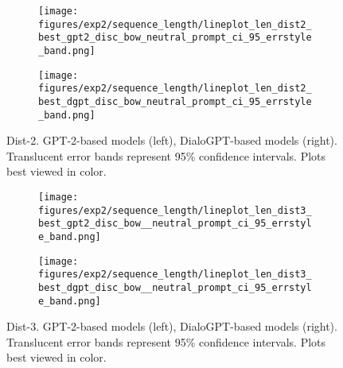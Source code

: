 \begin{figure}[H]
     \centering
     \begin{subfigure}[b]{0.49\textwidth}
        \centering
\texttt{[image: figures/exp2/sequence\_length/lineplot\_len\_dist2\_best\_gpt2\_disc\_bow\_neutral\_prompt\_ci\_95\_errstyle\_band.png]}
        \caption{}
        \label{subfig:lineplot_length_dist2_np_gpt2}
     \end{subfigure}
     \hfill
     \begin{subfigure}[b]{0.49\textwidth}
        \centering
        \texttt{[image: figures/exp2/sequence\_length/lineplot\_len\_dist2\_best\_dgpt\_disc\_bow\_neutral\_prompt\_ci\_95\_errstyle\_band.png]}
        \caption{}
        \label{subfig:lineplot_length_dist2_np_dgpt}
     \end{subfigure}
        \caption{Dist-2. GPT-2-based models (left), DialoGPT-based models (right). Translucent error bands represent 95\% confidence intervals. Plots best viewed in color.}
        \label{fig:lineplots_length_dist2_np_gpt2_dgpt}
\end{figure}

\begin{figure}[H]
     \centering
     \begin{subfigure}[b]{0.49\textwidth}
        \centering
\texttt{[image: figures/exp2/sequence\_length/lineplot\_len\_dist3\_best\_gpt2\_disc\_bow\_\_neutral\_prompt\_ci\_95\_errstyle\_band.png]}
        \caption{}
        \label{subfig:lineplot_length_dist3_np_gpt2}
     \end{subfigure}
     \hfill
     \begin{subfigure}[b]{0.49\textwidth}
        \centering
        \texttt{[image: figures/exp2/sequence\_length/lineplot\_len\_dist3\_best\_dgpt\_disc\_bow\_\_neutral\_prompt\_ci\_95\_errstyle\_band.png]}
        \caption{}
        \label{subfig:lineplot_length_dist3_np_dgpt}
     \end{subfigure}
        \caption{Dist-3. GPT-2-based models (left), DialoGPT-based models (right). Translucent error bands represent 95\% confidence intervals. Plots best viewed in color.}
        \label{fig:lineplots_length_dist3_np_gpt2_dgpt}
\end{figure}


